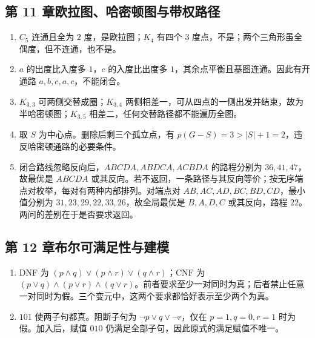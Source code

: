 \documentclass[UTF8,fontset=none,zihao=-4,a4paper]{ctexart}
\begin{document}
\subsection*{第 11 章\quad 欧拉图、哈密顿图与带权路径}
\begin{enumerate}[label=11.\arabic*.,leftmargin=2.8em]
\item $C_5$ 连通且全为 $2$ 度，是欧拉图；$K_4$ 有四个 $3$ 度点，不是；两个三角形虽全偶度，但不连通，也不是。

\item $a$ 的出度比入度多 $1$，$c$ 的入度比出度多 $1$，其余点平衡且基图连通。因此有开通路 $a,b,c,a,c$，不能闭合。

\item $K_{3,3}$ 可两侧交替成圈；$K_{3,4}$ 两侧相差一，可从四点的一侧出发并结束，故为半哈密顿图；$K_{3,5}$ 相差二，任何交替路径都不能遍历全图。

\item 取 $S$ 为中心点。删除后剩三个孤立点，有 $p(G-S)=3>|S|+1=2$，违反哈密顿通路的必要条件。

\item 闭合路线忽略反向后，$ABCDA,ABDCA,ACBDA$ 的路程分别为 $36,41,47$，故最优是 $ABCDA$ 或其反向。若不返回，一条路径与其反向等价；按无序端点对枚举，每对有两种内部排列。对端点对 $AB,AC,AD,BC,BD,CD$，最小值分别为 $31,23,29,22,33,26$，故全局最优是 $B,A,D,C$ 或其反向，路程 $22$。两问的差别在于是否要求返回。
\end{enumerate}

\subsection*{第 12 章\quad 布尔可满足性与建模}
\begin{enumerate}[label=12.\arabic*.,leftmargin=2.8em]
\item DNF 为 $(p\land q)\lor(p\land r)\lor(q\land r)$；CNF 为 $(p\lor q)\land(p\lor r)\land(q\lor r)$。前者要求至少一对同时为真；后者禁止任意一对同时为假。三个变元中，这两个要求都恰好表示至少两个为真。
\item $101$ 使两子句都真。阻断子句为 $\neg p\lor q\lor\neg r$，仅在 $p=1,q=0,r=1$ 时为假。加入后，赋值 $010$ 仍满足全部子句，因此原式的满足赋值不唯一。
\end{enumerate}
\end{document}
